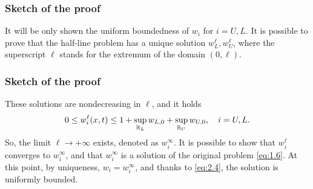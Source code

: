 
\begin{frame}
    \frametitle{Sketch of the proof}
    \begin{proofs}
        It will be only shown the uniform boundedness of \(w_i\) for \(i = U, L\).
        It is possible to prove that the half-line problem has a unique solution \(w_L^\ell, w_{U}^\ell\), where the superscript \(\ell\) stands for the extremum of the domain \((0, \ell)\). 
    \end{proofs}
\end{frame}

\begin{frame}
    \frametitle{Sketch of the proof}
    \begin{proofe}
        These solutions are nondecreasing in \(\ell\), and it holds 
        \begin{equation}
            0 \leq w_i^\ell(x,t) \leq 1 + \sup_{\mathbb{R}_L} w_{L,0} + \sup_{\mathbb{R}_{U}} w_{U,0}, \quad i = U, L.
            \label{eq:2.4}
        \end{equation}
        So, the limit \(\ell \to +\infty\) exists, denoted as \(w_i^\infty\).
        It is possible to show that \(w_i^\ell\) converges to \(w_i^\infty\), and that \(w_i^\infty\) is a solution of the original problem \ref{eq:1.6}. 
        At this point, by uniqueness, \(w_i = w_i^\infty\), and thanks to \eqref{eq:2.4}, the solution is uniformly bounded.
    \end{proofe}
\end{frame}
    
